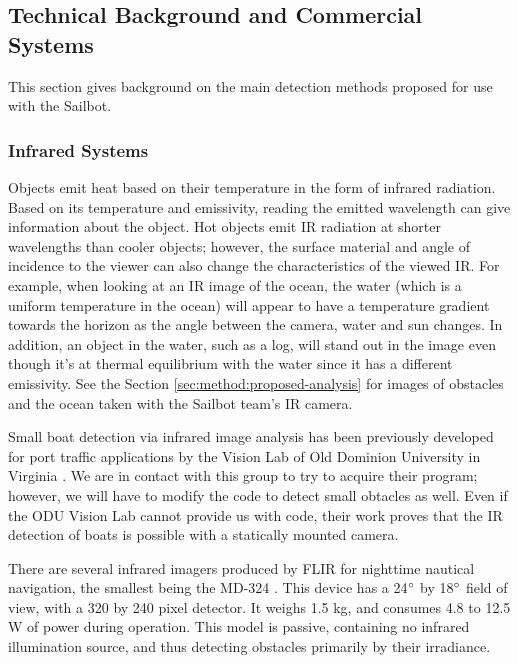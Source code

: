 \subsection{\label{sec:intro:technical-background}Technical Background and Commercial Systems}
This section gives background on the main detection methods proposed for use with the Sailbot.


\subsubsection{\label{sec:intro:technical-background:ir}Infrared Systems}
Objects emit heat based on their temperature in the form of infrared radiation. Based on its temperature and emissivity, reading the emitted wavelength can give information about the object. Hot objects emit IR radiation at shorter wavelengths than cooler objects; however, the surface material and angle of incidence to the viewer can also change the characteristics of the viewed IR. For example, when looking at an IR image of the ocean, the water (which is a uniform temperature in the ocean) will appear to have a temperature gradient towards the horizon as the angle between the camera, water and sun changes. In addition, an object in the water, such as a log, will stand out in the image even though it's at thermal equilibrium with the water since it has a different emissivity. See the Section \ref{sec:method:proposed-analysis} for images of obstacles and the ocean taken with the Sailbot team's IR camera.

Small boat detection via infrared image analysis has been previously developed for port traffic applications by the Vision Lab of Old Dominion University in Virginia \cite{ODU-boat-IR-detection}. We are in contact with this group to try to acquire their program; however, we will have to modify the code to detect small obtacles as well. Even if the ODU Vision Lab cannot provide us with code, their work proves that the IR detection of boats is possible with a statically mounted camera.

There are several infrared imagers produced by FLIR for nighttime nautical navigation, the smallest being the MD-324 \cite{flir-md324}. This device has a 24$\degree$ by 18$\degree$ field of view, with a 320 by 240 pixel detector. It weighs 1.5 kg, and consumes 4.8 to 12.5 W of power during operation. This model is passive, containing no infrared illumination source, and thus detecting obstacles primarily by their irradiance.


